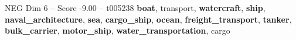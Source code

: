 \begin{textsample}{NEG Dim 6 – Score -9.00 – t005238}  \label{ex:f6_neg_014}
\textbf{boat}, transport, \textbf{watercraft}, \textbf{ship}, \textbf{naval\_architecture}, \textbf{sea}, \textbf{cargo\_ship}, \textbf{ocean}, \textbf{freight\_transport}, \textbf{tanker}, \textbf{bulk\_carrier}, \textbf{motor\_ship}, \textbf{water\_transportation}, cargo

\end{textsample}
